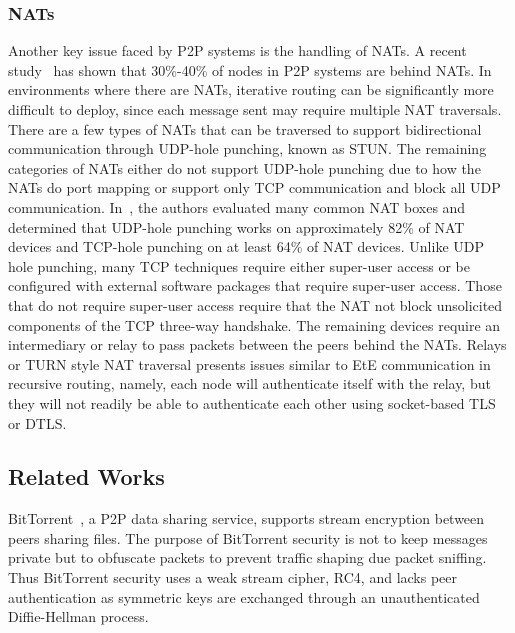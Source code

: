 \documentclass[conference]{IEEEtran}
\begin{document}
\subsubsection{NATs}
Another key issue faced by P2P systems is the handling of NATs.
A recent study~\cite{p2p_nats} has shown that 30\%-40\% of nodes in P2P systems
are behind NATs.  In environments where there are NATs, iterative routing can be
significantly more difficult to deploy, since each message sent may require
multiple NAT traversals.  There are a few types of NATs that can be traversed
to support bidirectional communication through UDP-hole punching, known as STUN.
The remaining categories of NATs either do not support UDP-hole punching due to
how the NATs do port mapping or support only TCP communication and block all
UDP communication.  In~\cite{tcp_nat, p2p_nat}, the authors evaluated many
common NAT boxes and determined that UDP-hole punching works on approximately
82\% of NAT devices and TCP-hole punching on at least 64\% of NAT devices.
Unlike UDP hole punching, many TCP techniques require either super-user access
or be configured with external software packages that require super-user access.
Those that do not require super-user access require that the NAT not block
unsolicited components of the TCP three-way handshake.
The remaining devices require an intermediary or relay to pass packets
between the peers behind the NATs.  Relays or TURN style NAT traversal
presents issues similar to EtE communication in recursive routing, namely, each
node will authenticate itself with the relay, but they will not readily be
able to authenticate each other using socket-based TLS or DTLS.

\subsection{Related Works}
BitTorrent~\cite{bittorrent_security}, a P2P data sharing service,  supports
stream encryption between peers sharing files.  The purpose of BitTorrent
security is not to keep messages private but to obfuscate packets to
prevent traffic shaping due packet sniffing. Thus BitTorrent security uses a
weak stream cipher, RC4, and lacks peer authentication as symmetric keys are
exchanged through an unauthenticated Diffie-Hellman process.
\end{document}
